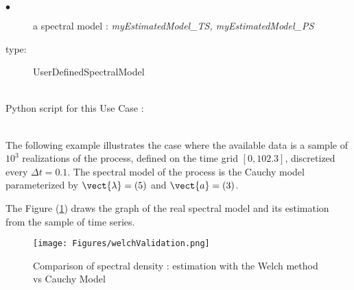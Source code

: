 {

  \begin{description}
  \item[$\bullet$] a spectral model : {\itshape myEstimatedModel\_TS, myEstimatedModel\_PS}
  \item[type:]  UserDefinedSpectralModel
  \end{description}

}

\textspace\\
Python script for this Use Case :



\textspace\\


The following example illustrates the case where the available data is a sample of  $10^3$ realizations of the process, defined on the time grid  $[0, 102.3]$, discretized every $\Delta t = 0.1$. The spectral model of the process is the Cauchy model parameterized by $\vect{\lambda}=(5)$ and $\vect{a}=(3)$.

The Figure (\ref{welch_validation}) draws the graph of the real spectral model and its estimation from the sample of time series.
\begin{figure}[H]
  \begin{center}
    \texttt{[image: Figures/welchValidation.png]}
    \caption{Comparison of spectral density : estimation with the Welch method vs Cauchy Model}
    \label{welch_validation}
  \end{center}
\end{figure}
